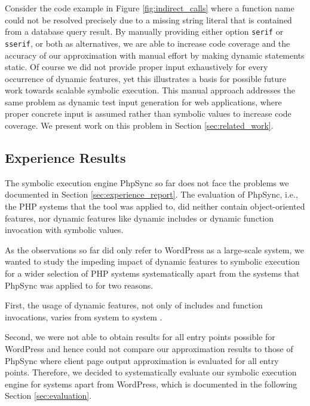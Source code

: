 \documentclass[sigconf]{acmart}
\renewcommand{\sf}[1]{\textsf{#1}}
\renewcommand{\tt}[1]{\texttt{#1}}
\begin{document}
Consider the code example in Figure \ref{fig:indirect_calls} where a function
name could not be resolved precisely due to a missing string literal that is contained from a
database query result. By manually providing either option \tt{serif} or
\tt{sserif}, or both as alternatives, we are able to increase code coverage and
the accuracy of our approximation with manual effort by making dynamic
statements static. Of course we did not provide proper input exhaustively for
every occurrence of dynamic features, yet this illustrates a basis for possible
future work towards scalable symbolic execution. This manual approach addresses
the same problem as dynamic test input generation for web applications, where
proper concrete input is assumed rather than symbolic values to increase code
coverage. We present work on this problem in Section \ref{sec:related_work}.


\subsection{Experience Results} \label{sec:experience_results}
The symbolic execution engine \sf{PhpSync} \cite{Nguyen:2014:BCG:2635868.2635928} so far does not face the
problems we documented in Section \ref{sec:experience_report}. The evaluation of
PhpSync, i.e., the PHP systems that the tool was applied to, did neither contain object-oriented
features, nor dynamic features like dynamic includes or dynamic function
invocation with symbolic values.
 
As the observations so far did only refer to \sf{WordPress} as a large-scale
system, we wanted to study the impeding impact of dynamic features to symbolic
execution for a wider selection of PHP systems systematically apart from the
systems that \sf{PhpSync} was applied to for two reasons. 

First, the usage of dynamic features, not only of includes and function invocations, varies from
system to system \cite{hills2015variable}. 

Second, we were not able to obtain results for all entry points possible for
\sf{WordPress} and hence could not compare our approximation results to those of
\sf{PhpSync} where client page output approximation is evaluated for all entry points. Therefore, we decided to
systematically evaluate our symbolic execution engine for systems apart from
\sf{WordPress}, which is documented in the following Section
\ref{sec:evaluation}.
\end{document}
